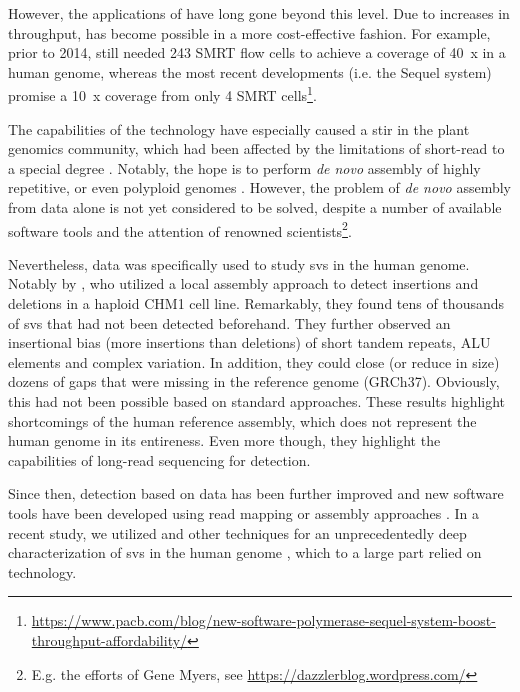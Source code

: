 However, the applications of \pacbio have long gone beyond this level. Due to
increases in throughput, \wgs has become possible in a more cost-effective
fashion. For example, prior to 2014, \citet{Chaisson2014} still needed 243 SMRT
flow cells to achieve a coverage of 40~x in a human genome, whereas the most
recent developments (i.e. the \pacbio Sequel system) promise a 10~x coverage
from only 4 SMRT cells\footnote{\label{footnote:pacbioblog}%
\url{https://www.pacb.com/blog/new-software-polymerase-sequel-system-boost-throughput-affordability/}}.

The capabilities of the \pacbio technology have especially caused a stir in the
plant genomics community, which had been affected by the limitations of
short-read \mps to a special degree \citep{Bickhart2014}. Notably, the hope is
to perform \textit{de novo} assembly of highly repetitive, or even polyploid
genomes \citep{Li2017}. However, the problem of \textit{de novo} assembly from
\pacbio data alone is not yet considered to be solved, despite a number of
available software tools \citep{Chin2013,Chin2016,Koren2017,Koren2018} and the
attention of renowned scientists\footnote{E.g. the efforts of Gene Myers, see
\url{https://dazzlerblog.wordpress.com/}}.

Nevertheless, \pacbio \wgs data was specifically used to study \acp{sv} in the
human genome. Notably by \citet{Chaisson2014}, who utilized a local assembly approach to detect
insertions and deletions in a haploid CHM1 cell line. Remarkably, they found
tens of thousands of \acp{sv} that had not been detected beforehand. They further
observed an insertional bias (more insertions than deletions) of short tandem
repeats, ALU elements and complex variation. In addition, they could close (or
reduce in size) dozens of gaps that were missing in the reference genome
(GRCh37). Obviously, this had not been possible based on standard \mps
approaches. These results highlight shortcomings of the human reference assembly,
which does not represent the human genome in its entireness. Even more though,
they highlight the capabilities of long-read sequencing for \sv detection.

Since then, \sv detection based on \pacbio data has been further improved and
new software tools have been developed using read mapping or assembly approaches
\citep{Pendleton2015,Huddleston2017}. In a recent study, we utilized \pacbio and
other techniques for an unprecedentedly deep characterization of \acp{sv} in
the human genome \citep{Chaisson2017}, which to a large part relied on \pacbio
technology.


